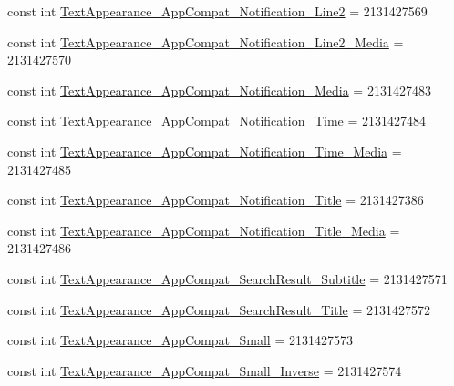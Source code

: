 \begin{DoxyCompactItemize}
\item 
const int \mbox{\hyperlink{class_f_w_p_s___app_1_1_droid_1_1_resource_1_1_style_a6e3051a1040c8f4d36f814924abe0d09}{Text\+Appearance\+\_\+\+App\+Compat\+\_\+\+Notification\+\_\+\+Line2}} = 2131427569
\item 
const int \mbox{\hyperlink{class_f_w_p_s___app_1_1_droid_1_1_resource_1_1_style_ac6fd98aa8cf36f94c0e27432d5092494}{Text\+Appearance\+\_\+\+App\+Compat\+\_\+\+Notification\+\_\+\+Line2\+\_\+\+Media}} = 2131427570
\item 
const int \mbox{\hyperlink{class_f_w_p_s___app_1_1_droid_1_1_resource_1_1_style_a4af4b6a5db2d3096884961f5e0171035}{Text\+Appearance\+\_\+\+App\+Compat\+\_\+\+Notification\+\_\+\+Media}} = 2131427483
\item 
const int \mbox{\hyperlink{class_f_w_p_s___app_1_1_droid_1_1_resource_1_1_style_a3b20f1c125b50fca80cb3ddd5e80e06d}{Text\+Appearance\+\_\+\+App\+Compat\+\_\+\+Notification\+\_\+\+Time}} = 2131427484
\item 
const int \mbox{\hyperlink{class_f_w_p_s___app_1_1_droid_1_1_resource_1_1_style_a7fdb0d9293e47fd017907dcf4733caf5}{Text\+Appearance\+\_\+\+App\+Compat\+\_\+\+Notification\+\_\+\+Time\+\_\+\+Media}} = 2131427485
\item 
const int \mbox{\hyperlink{class_f_w_p_s___app_1_1_droid_1_1_resource_1_1_style_a57afa49ba3fb8e65af82a645747eec6d}{Text\+Appearance\+\_\+\+App\+Compat\+\_\+\+Notification\+\_\+\+Title}} = 2131427386
\item 
const int \mbox{\hyperlink{class_f_w_p_s___app_1_1_droid_1_1_resource_1_1_style_a729b264e537646c6e3af2203300006f3}{Text\+Appearance\+\_\+\+App\+Compat\+\_\+\+Notification\+\_\+\+Title\+\_\+\+Media}} = 2131427486
\item 
const int \mbox{\hyperlink{class_f_w_p_s___app_1_1_droid_1_1_resource_1_1_style_a096c57624348a32619b9644e722d1f6c}{Text\+Appearance\+\_\+\+App\+Compat\+\_\+\+Search\+Result\+\_\+\+Subtitle}} = 2131427571
\item 
const int \mbox{\hyperlink{class_f_w_p_s___app_1_1_droid_1_1_resource_1_1_style_a3e65b0bc5b214a153cd97393e1458787}{Text\+Appearance\+\_\+\+App\+Compat\+\_\+\+Search\+Result\+\_\+\+Title}} = 2131427572
\item 
const int \mbox{\hyperlink{class_f_w_p_s___app_1_1_droid_1_1_resource_1_1_style_ae15670ec437e42efb6d2893aed05587c}{Text\+Appearance\+\_\+\+App\+Compat\+\_\+\+Small}} = 2131427573
\item 
const int \mbox{\hyperlink{class_f_w_p_s___app_1_1_droid_1_1_resource_1_1_style_a8ada7cb4a75430025f092a5e32158de5}{Text\+Appearance\+\_\+\+App\+Compat\+\_\+\+Small\+\_\+\+Inverse}} = 2131427574

\end{DoxyCompactItemize}
